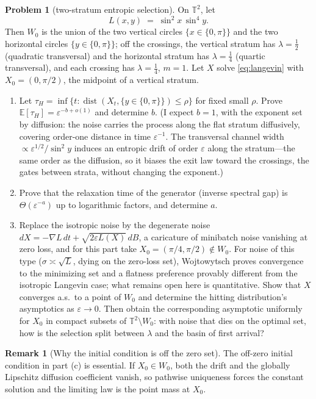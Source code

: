 \documentclass[11pt]{amsart}
\theoremstyle{plain}
\theoremstyle{definition}
\newtheorem{problem}[theorem]{Problem}
\newtheorem{remark}[theorem]{Remark}
\newcommand{\E}{\mathbb{E}}
\newcommand{\T}{\mathbb{T}}
\newcommand{\dist}{\operatorname{dist}}
\begin{document}
\begin{problem}[two-stratum entropic selection]\label{prob:entropic}
On $\T^2$, let
\[
   L(x, y) \;=\; \sin^2\! x \, \sin^4\! y .
\]
Then $W_0$ is the union of the two vertical circles $\{ x \in \{0, \pi\} \}$ and the two horizontal circles $\{ y \in \{0, \pi\} \}$; off the crossings, the vertical stratum has $\lambda = \tfrac12$ (quadratic transversal) and the horizontal stratum has $\lambda = \tfrac14$ (quartic transversal), and each crossing has $\lambda = \tfrac14$, $m = 1$. Let $X$ solve \eqref{eq:langevin} with $X_0 = (0, \pi/2)$, the midpoint of a vertical stratum.
\begin{enumerate}
\item[(a)] Let $\tau_H = \inf\{ t : \dist(X_t, \{ y \in \{0,\pi\} \}) \le \rho \}$ for fixed small $\rho$. Prove $\E[\tau_H] = \varepsilon^{-b + o(1)}$ and determine $b$. (I expect $b = 1$, with the exponent set by diffusion: the noise carries the process along the flat stratum diffusively, covering order-one distance in time $\varepsilon^{-1}$. The transversal channel width $\propto \varepsilon^{1/2} / \sin^2 y$ induces an entropic drift of order $\varepsilon$ along the stratum---the same order as the diffusion, so it biases the exit law toward the crossings, the gates between strata, without changing the exponent.)
\item[(b)] Prove that the relaxation time of the generator (inverse spectral gap) is $\Theta(\varepsilon^{-a})$ up to logarithmic factors, and determine $a$.
\item[(c)] Replace the isotropic noise by the degenerate noise $dX = -\nabla L\, dt + \sqrt{2 \varepsilon L(X)}\, dB$, a caricature of minibatch noise vanishing at zero loss, and for this part take $X_0=(\pi/4,\pi/2)\notin W_0$. For noise of this type ($\sigma \asymp \sqrt{L}$, dying on the zero-loss set), Wojtowytsch \cite{wojtowytsch2023} proves convergence to the minimizing set and a flatness preference provably different from the isotropic Langevin case; what remains open here is quantitative. Show that $X$ converges a.s.\ to a point of $W_0$ and determine the hitting distribution's asymptotics as $\varepsilon \to 0$. Then obtain the corresponding asymptotic uniformly for $X_0$ in compact subsets of $\T^2\setminus W_0$: with noise that dies on the optimal set, how is the selection split between $\lambda$ and the basin of first arrival?
\end{enumerate}
\end{problem}

\begin{remark}[Why the initial condition is off the zero set]
The off-zero initial condition in part (c) is essential. If $X_0\in W_0$, both the drift and the globally Lipschitz diffusion coefficient vanish, so pathwise uniqueness forces the constant solution and the limiting law is the point mass at $X_0$.
\end{remark}
\end{document}
